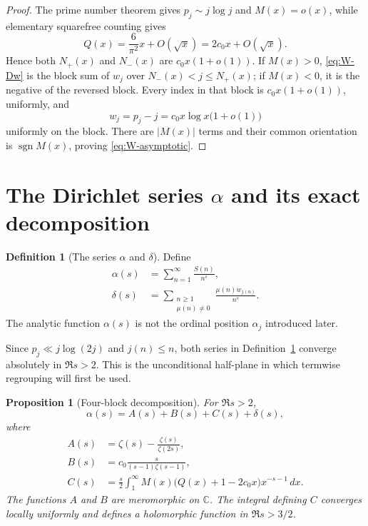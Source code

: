 \documentclass[11pt]{amsart}
\numberwithin{equation}{section}
\theoremstyle{plain}
\newtheorem{proposition}[theorem]{Proposition}
\theoremstyle{definition}
\newtheorem{definition}[theorem]{Definition}
\theoremstyle{remark}
\newcommand{\C}{\mathbb C}
\newcommand{\sgn}{\operatorname{sgn}}
\begin{document}
\begin{proof}
The prime number theorem gives $p_j\sim j\log j$ and $M(x)=o(x)$, while
elementary squarefree counting gives
\begin{equation}
Q(x)=\frac6{\pi^2}x+O(\sqrt{x})=2c_0x+O(\sqrt{x}).
\label{eq:Q-asymptotic}
\end{equation}
Hence both $N_+(x)$ and $N_-(x)$ are $c_0x(1+o(1))$.  If $M(x)>0$,
\eqref{eq:W-Dw} is the block sum of $w_j$ over
$N_-(x)<j\le N_+(x)$; if $M(x)<0$, it is the negative of the reversed
block.  Every index in that block is $c_0x(1+o(1))$, uniformly, and
\begin{equation}
w_j=p_j-j=c_0x\log x\bigl(1+o(1)\bigr)
\label{eq:w-uniform-block}
\end{equation}
uniformly on the block.  There are $|M(x)|$ terms and their common orientation
is $\sgn M(x)$, proving \eqref{eq:W-asymptotic}.
\end{proof}

\section{The Dirichlet series \texorpdfstring{$\alpha$}{alpha} and its exact decomposition}
\label{sec:alpha-decomposition}

\begin{definition}[The series $\alpha$ and $\delta$]
\label{def:alpha-delta}
Define
\begin{align}
\alpha(s)&=\sum_{n=1}^{\infty}\frac{S(n)}{n^s},
\label{eq:alpha-definition}\\
\delta(s)&=
\sum_{\substack{n\ge1\\ \mu(n)\ne0}}
\frac{\mu(n)w_{j(n)}}{n^s}.
\label{eq:delta-definition}
\end{align}
The analytic function $\alpha(s)$ is not the ordinal position $\alpha_j$
introduced later.
\end{definition}

Since $p_j\ll j\log(2j)$ and $j(n)\le n$, both series in
Definition~\ref{def:alpha-delta} converge absolutely in $\Re s>2$.  This is
the unconditional half-plane in which termwise regrouping will first be used.

\begin{proposition}[Four-block decomposition]
\label{prop:alpha-four-blocks}
For $\Re s>2$,
\begin{equation}
\alpha(s)=A(s)+B(s)+C(s)+\delta(s),
\label{eq:alpha-ABCD}
\end{equation}
where
\begin{align}
A(s)&=\zeta(s)-\frac{\zeta(s)}{\zeta(2s)},
\label{eq:A-definition}\\
B(s)&=c_0\frac{s}{(s-1)\zeta(s-1)},
\label{eq:B-definition}\\
C(s)&=\frac{s}{2}\int_1^\infty
M(x)\bigl(Q(x)+1-2c_0x\bigr)x^{-s-1}\,dx.
\label{eq:C-definition}
\end{align}
The functions $A$ and $B$ are meromorphic on $\C$.  The integral defining
$C$ converges locally uniformly and defines a holomorphic function in
$\Re s>3/2$.
\end{proposition}
\end{document}
